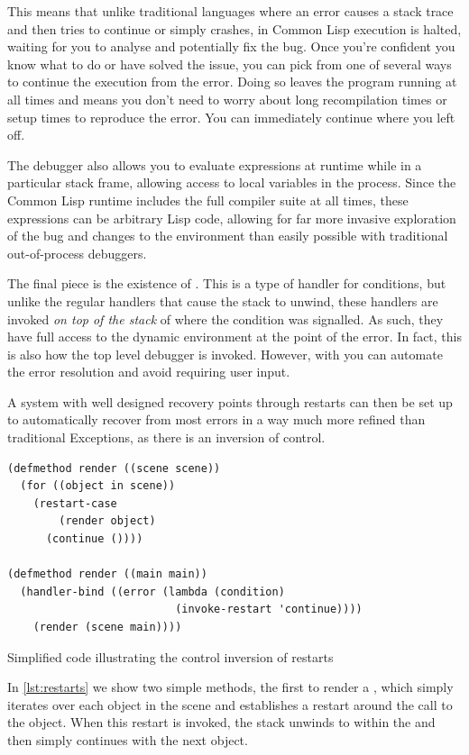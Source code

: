 \documentclass[a4paper]{paper}
\begin{document}
This means that unlike traditional languages where an error causes a stack trace and then tries to continue or simply crashes, in Common Lisp execution is halted, waiting for you to analyse and potentially fix the bug. Once you're confident you know what to do or have solved the issue, you can pick from one of several ways to continue the execution from the error. Doing so leaves the program running at all times and means you don't need to worry about long recompilation times or setup times to reproduce the error. You can immediately continue where you left off.

The debugger also allows you to evaluate expressions at runtime while in a particular stack frame, allowing access to local variables in the process. Since the Common Lisp runtime includes the full compiler suite at all times, these expressions can be arbitrary Lisp code, allowing for far more invasive exploration of the bug and changes to the environment than easily possible with traditional out-of-process debuggers.

The final piece is the existence of . This is a type of handler for conditions, but unlike the regular handlers that cause the stack to unwind, these handlers are invoked \textit{on top of the stack} of where the condition was signalled. As such, they have full access to the dynamic environment at the point of the error. In fact, this is also how the top level debugger is invoked. However, with  you can automate the error resolution and avoid requiring user input.

A system with well designed recovery points through restarts can then be set up to automatically recover from most errors in a way much more refined than traditional Exceptions, as there is an inversion of control.

\begin{listing}[H]
\begin{verbatim}
(defmethod render ((scene scene))
  (for ((object in scene))
    (restart-case
        (render object)
      (continue ())))

(defmethod render ((main main))
  (handler-bind ((error (lambda (condition)
                          (invoke-restart 'continue))))
    (render (scene main))))
\end{verbatim}
\caption{Simplified code illustrating the control inversion of restarts}
\label{lst:restarts}
\end{listing}

In \autoref{lst:restarts} we show two simple methods, the first to render a , which simply iterates over each object in the scene and establishes a  restart around the call to  the object. When this restart is invoked, the stack unwinds to within the  and then simply continues with the next object.
\end{document}

